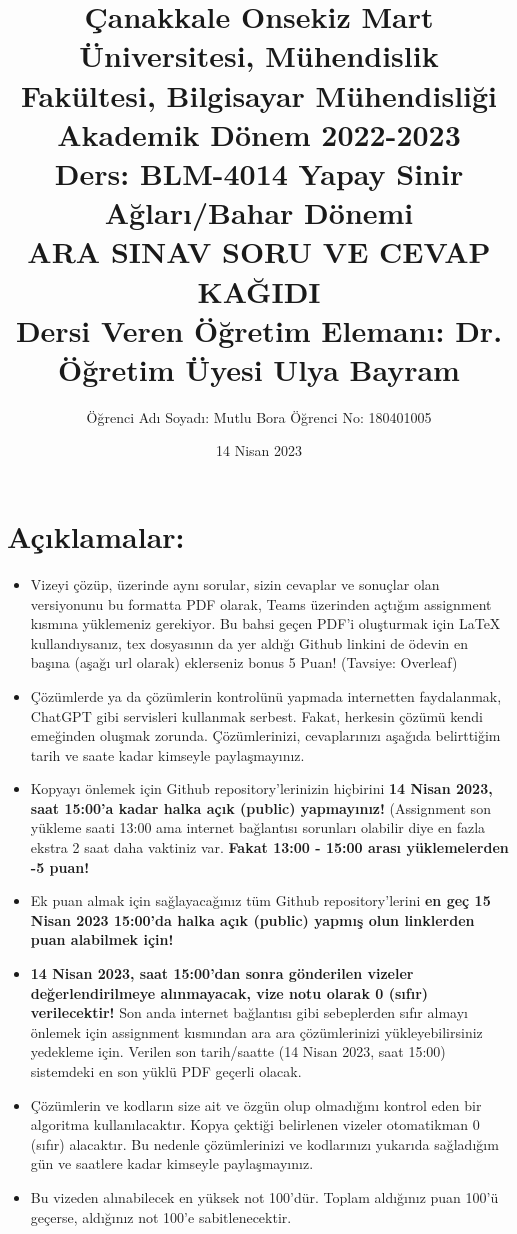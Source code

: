 \documentclass[11pt]{article}
\title{Çanakkale Onsekiz Mart Üniversitesi, Mühendislik Fakültesi, Bilgisayar Mühendisliği Akademik Dönem 2022-2023\\
Ders: BLM-4014 Yapay Sinir Ağları/Bahar Dönemi\\ 
ARA SINAV SORU VE CEVAP KAĞIDI\\
Dersi Veren Öğretim Elemanı: Dr. Öğretim Üyesi Ulya Bayram}
\author{%
\begin{minipage}{\textwidth}
\raggedright
Öğrenci Adı Soyadı: Mutlu Bora
Öğrenci No: 180401005
\end{minipage}%
}
\date{14 Nisan 2023}
\begin{document}
\maketitle

\vspace{-.5in}
\section*{Açıklamalar:}
\begin{itemize}
    \item Vizeyi çözüp, üzerinde aynı sorular, sizin cevaplar ve sonuçlar olan versiyonunu bu formatta PDF olarak, Teams üzerinden açtığım assignment kısmına yüklemeniz gerekiyor. Bu bahsi geçen PDF'i oluşturmak için LaTeX kullandıysanız, tex dosyasının da yer aldığı Github linkini de ödevin en başına (aşağı url olarak) eklerseniz bonus 5 Puan! (Tavsiye: Overleaf)
    \item Çözümlerde ya da çözümlerin kontrolünü yapmada internetten faydalanmak, ChatGPT gibi servisleri kullanmak serbest. Fakat, herkesin çözümü kendi emeğinden oluşmak zorunda. Çözümlerinizi, cevaplarınızı aşağıda belirttiğim tarih ve saate kadar kimseyle paylaşmayınız. 
    \item Kopyayı önlemek için Github repository'lerinizin hiçbirini \textbf{14 Nisan 2023, saat 15:00'a kadar halka açık (public) yapmayınız!} (Assignment son yükleme saati 13:00 ama internet bağlantısı sorunları olabilir diye en fazla ekstra 2 saat daha vaktiniz var. \textbf{Fakat 13:00 - 15:00 arası yüklemelerden -5 puan!}
    \item Ek puan almak için sağlayacağınız tüm Github repository'lerini \textbf{en geç 15 Nisan 2023 15:00'da halka açık (public) yapmış olun linklerden puan alabilmek için!}
    \item \textbf{14 Nisan 2023, saat 15:00'dan sonra gönderilen vizeler değerlendirilmeye alınmayacak, vize notu olarak 0 (sıfır) verilecektir!} Son anda internet bağlantısı gibi sebeplerden sıfır almayı önlemek için assignment kısmından ara ara çözümlerinizi yükleyebilirsiniz yedekleme için. Verilen son tarih/saatte (14 Nisan 2023, saat 15:00) sistemdeki en son yüklü PDF geçerli olacak.
    \item Çözümlerin ve kodların size ait ve özgün olup olmadığını kontrol eden bir algoritma kullanılacaktır. Kopya çektiği belirlenen vizeler otomatikman 0 (sıfır) alacaktır. Bu nedenle çözümlerinizi ve kodlarınızı yukarıda sağladığım gün ve saatlere kadar kimseyle paylaşmayınız.
    \item Bu vizeden alınabilecek en yüksek not 100'dür. Toplam aldığınız puan 100'ü geçerse, aldığınız not 100'e sabitlenecektir.

\end{itemize}
\end{document}

